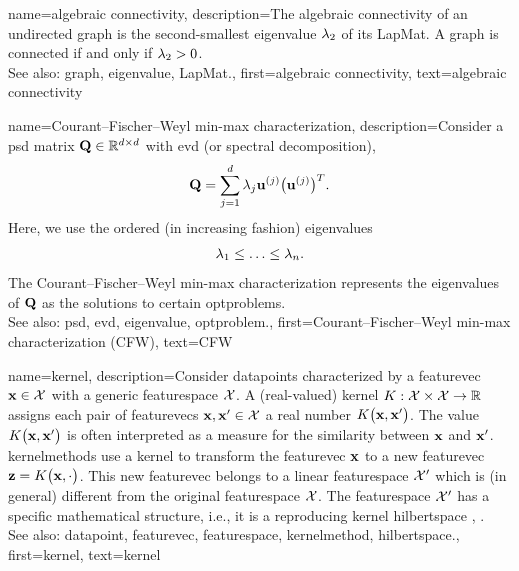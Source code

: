 {name={algebraic connectivity},
	description={The algebraic connectivity of an undirected \gls{graph} 
		is the second-smallest \gls{eigenvalue} $\lambda_{2}$ of its \gls{LapMat}. A \gls{graph} is connected if and only if 
		$\lambda_{2} >0$. 
				\\
		See also: \gls{graph}, \gls{eigenvalue}, \gls{LapMat}.},
	first={algebraic connectivity},
	text={algebraic connectivity}
}


{name={Courant–Fischer–Weyl min-max characterization}, 
	description={Consider a \gls{psd} 
		matrix $\mathbf{Q} \in \mathbb{R}^{d \times d}$ with 
		\gls{evd} (or spectral decomposition), 
		$$ \mathbf{Q} = \sum_{j=1}^{d} \lambda_{j} {\bf u}^{(j)} \big(  {\bf u}^{(j)}  \big)^{T}.$$ 
		Here, we use the ordered (in increasing fashion) \glspl{eigenvalue} 
		\begin{equation}
			\nonumber
		 	\lambda_{1}  \leq  \ldots \leq \lambda_{n}. 
		\end{equation}
		The Courant–Fischer–Weyl min-max characterization \cite[Th. 8.1.2]{GolubVanLoanBook} 
		represents the \glspl{eigenvalue} of $\mathbf{Q}$ as the solutions to certain \glspl{optproblem}.
			\\
		See also: \gls{psd}, \gls{evd}, \gls{eigenvalue}, \gls{optproblem}.}, 
	first={Courant–Fischer–Weyl min-max characterization (CFW)}, 
	text={CFW}
}

{name={kernel}, 
	description={Consider \glspl{datapoint} characterized by a \gls{featurevec} ${\bf x} \in \mathcal{X}$ 
		with a generic \gls{featurespace} $\mathcal{X}$. A (real-valued) kernel $K: \mathcal{X} \times \mathcal{X} \rightarrow \mathbb{R}$ 
		assigns each pair of \glspl{featurevec} ${\bf x}, {\bf x}' \in \mathcal{X}$ a real number $K\big({\bf x},{\bf x}'\big)$. 
		The value $K\big({\bf x},{\bf x}'\big)$ is often interpreted as a measure for the similarity between ${\bf x}$ 
		and ${\bf x}'$. \Glspl{kernelmethod} use a kernel to transform the \gls{featurevec} ${\bf x}$ to a new \gls{featurevec} ${\bf z} = K\big({\bf x},\cdot\big)$. 
         	This new \gls{featurevec} belongs to a linear \gls{featurespace} $\mathcal{X}'$ which is (in general)  
          	different from the original \gls{featurespace} $\mathcal{X}$. The \gls{featurespace} $\mathcal{X}'$ has 
          	a specific mathematical structure, i.e., it is a reproducing kernel \gls{hilbertspace} \cite{LearningKernelsBook}, \cite{LampertNowKernel}.
          		\\
		See also: \gls{datapoint}, \gls{featurevec}, \gls{featurespace}, \gls{kernelmethod}, \gls{hilbertspace}.},
	first={kernel},
	text={kernel} 
}
	
